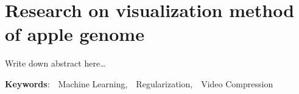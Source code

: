 
\chapter*{Research on visualization method of apple genome}
\linespread{1.25} 
\vspace{1em}

Write down abstract here\ldots

\vspace{1em}

\noindent\textbf{Keywords}:~~Machine Learning,~~Regularization,~~Video Compression

\linespread{1.5} 

